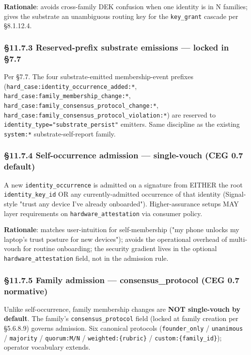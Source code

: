 \documentclass[10pt]{article}
\begin{document}
\textbf{Rationale}: avoids cross-family DEK confusion when one identity is in N families; gives the substrate an unambiguous routing key for the \texttt{key\_grant} cascade per §8.1.12.4.


\subsubsection*{§11.7.3 Reserved-prefix substrate emissions — locked in §7.7}


Per §7.7. The four substrate-emitted membership-event prefixes (\texttt{hard\_case:identity\_occurrence\_added:*}, \texttt{hard\_case:family\_membership\_change:*}, \texttt{hard\_case:family\_consensus\_protocol\_change:*}, \texttt{hard\_case:family\_consensus\_protocol\_violation:*}) are reserved to \texttt{identity\_type="substrate\_persist"} emitters. Same discipline as the existing \texttt{system:*} substrate-self-report family.


\subsubsection*{§11.7.4 Self-occurrence admission — single-vouch (CEG 0.7 default)}


A new \texttt{identity\_occurrence} is admitted on a signature from EITHER the root \texttt{identity\_key\_id} OR any currently-admitted occurrence of that identity (Signal-style "trust any device I've already onboarded"). Higher-assurance setups MAY layer requirements on \texttt{hardware\_attestation} via consumer policy.


\textbf{Rationale}: matches user-intuition for self-membership ("my phone unlocks my laptop's trust posture for new devices"); avoids the operational overhead of multi-vouch for routine onboarding; the security gradient lives in the optional \texttt{hardware\_attestation} field, not in the admission rule.


\subsubsection*{§11.7.5 Family admission — consensus\_protocol (CEG 0.7 normative)}


Unlike self-occurrence, family membership changes are \textbf{NOT single-vouch by default}. The family's \texttt{consensus\_protocol} field (locked at family creation per §5.6.8.9) governs admission. Six canonical protocols (\texttt{founder\_only} / \texttt{unanimous} / \texttt{majority} / \texttt{quorum:M/N} / \texttt{weighted:\{rubric\}} / \texttt{custom:\{family\_id\}}); operator vocabulary extends.
\end{document}
